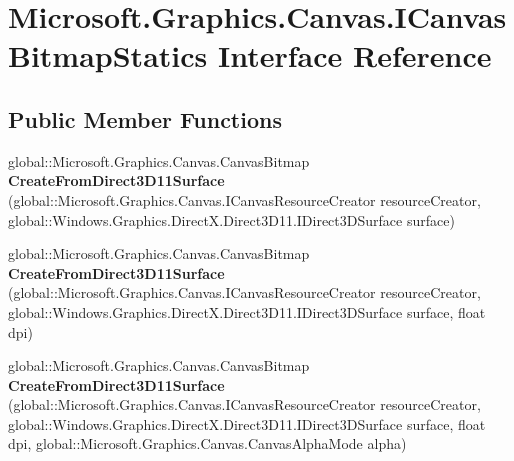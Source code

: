 \hypertarget{interface_microsoft_1_1_graphics_1_1_canvas_1_1_i_canvas_bitmap_statics}{}\section{Microsoft.\+Graphics.\+Canvas.\+I\+Canvas\+Bitmap\+Statics Interface Reference}
\label{interface_microsoft_1_1_graphics_1_1_canvas_1_1_i_canvas_bitmap_statics}
\subsection*{Public Member Functions}
\begin{DoxyCompactItemize}
\item 
\mbox{\label{interface_microsoft_1_1_graphics_1_1_canvas_1_1_i_canvas_bitmap_statics_a9060fd1c666787d1413990018a79b734}} 
global\+::\+Microsoft.\+Graphics.\+Canvas.\+Canvas\+Bitmap {\bfseries Create\+From\+Direct3\+D11\+Surface} (global\+::\+Microsoft.\+Graphics.\+Canvas.\+I\+Canvas\+Resource\+Creator resource\+Creator, global\+::\+Windows.\+Graphics.\+Direct\+X.\+Direct3\+D11.\+I\+Direct3\+D\+Surface surface)
\item 
\mbox{\label{interface_microsoft_1_1_graphics_1_1_canvas_1_1_i_canvas_bitmap_statics_aee573a2911f637d18825ba912cfe3f2e}} 
global\+::\+Microsoft.\+Graphics.\+Canvas.\+Canvas\+Bitmap {\bfseries Create\+From\+Direct3\+D11\+Surface} (global\+::\+Microsoft.\+Graphics.\+Canvas.\+I\+Canvas\+Resource\+Creator resource\+Creator, global\+::\+Windows.\+Graphics.\+Direct\+X.\+Direct3\+D11.\+I\+Direct3\+D\+Surface surface, float dpi)
\item 
\mbox{\label{interface_microsoft_1_1_graphics_1_1_canvas_1_1_i_canvas_bitmap_statics_ad53e9c0f924e391a804520ddd33144b1}} 
global\+::\+Microsoft.\+Graphics.\+Canvas.\+Canvas\+Bitmap {\bfseries Create\+From\+Direct3\+D11\+Surface} (global\+::\+Microsoft.\+Graphics.\+Canvas.\+I\+Canvas\+Resource\+Creator resource\+Creator, global\+::\+Windows.\+Graphics.\+Direct\+X.\+Direct3\+D11.\+I\+Direct3\+D\+Surface surface, float dpi, global\+::\+Microsoft.\+Graphics.\+Canvas.\+Canvas\+Alpha\+Mode alpha)

\end{DoxyCompactItemize}
